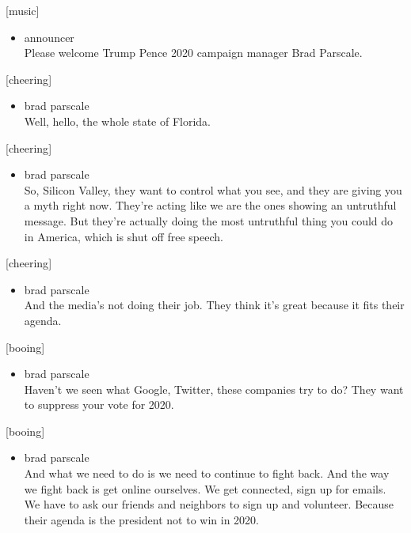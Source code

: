 {[}music{]}

\begin{itemize}
\tightlist
\item
  announcer\\
  Please welcome Trump Pence 2020 campaign manager Brad Parscale.
\end{itemize}

{[}cheering{]}

\begin{itemize}
\tightlist
\item
  brad parscale\\
  Well, hello, the whole state of Florida.
\end{itemize}

{[}cheering{]}

\begin{itemize}
\tightlist
\item
  brad parscale\\
  So, Silicon Valley, they want to control what you see, and they are
  giving you a myth right now. They're acting like we are the ones
  showing an untruthful message. But they're actually doing the most
  untruthful thing you could do in America, which is shut off free
  speech.
\end{itemize}

{[}cheering{]}

\begin{itemize}
\tightlist
\item
  brad parscale\\
  And the media's not doing their job. They think it's great because it
  fits their agenda.
\end{itemize}

{[}booing{]}

\begin{itemize}
\tightlist
\item
  brad parscale\\
  Haven't we seen what Google, Twitter, these companies try to do? They
  want to suppress your vote for 2020.
\end{itemize}

{[}booing{]}

\begin{itemize}
\tightlist
\item
  brad parscale\\
  And what we need to do is we need to continue to fight back. And the
  way we fight back is get online ourselves. We get connected, sign up
  for emails. We have to ask our friends and neighbors to sign up and
  volunteer. Because their agenda is the president not to win in 2020.
\end{itemize}

